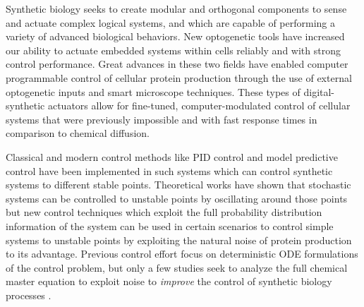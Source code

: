 \documentclass[12pt]{article}
\begin{document}
Synthetic biology seeks to create modular\cite{Ng2019} and orthogonal\cite{Liu2018} components to sense and actuate\cite{Sheets2020} complex logical systems\cite{Groseclose2020}, and which are capable of performing a variety of advanced biological behaviors\cite{Shin2020}. 
New optogenetic tools have increased our ability to actuate embedded systems within cells reliably and with strong control performance\cite{Sheets2020,Baumschlager2017,Chen2020,Lillacci2018}. Great advances in these two fields have enabled computer programmable control of cellular protein production through the use of external optogenetic inputs and smart microscope techniques\cite{Fox2021,Baumschlager2021,Lugagne2017}. These types of digital-synthetic actuators allow for fine-tuned, computer-modulated control of cellular systems that were previously impossible\cite{Rullan2018, Baumschlager2017} and with fast response times in comparison to chemical diffusion. 

Classical and modern control methods like PID control and model predictive control have been implemented in such systems\cite{} which can control synthetic systems to different stable points. Theoretical works have shown that stochastic systems can be controlled to unstable points by oscillating around those points \cite{Guarino2020} but new control techniques which exploit the full probability distribution information of the system can be used in certain scenarios to control simple systems to unstable points by exploiting the natural noise of protein production to its advantage. Previous control effort focus on deterministic ODE formulations of the control problem, but only a few studies seek to analyze the full chemical master equation to exploit noise to {\em improve} the control of synthetic biology processes \cite{Szymanska2015,May2021}.  
\end{document}
